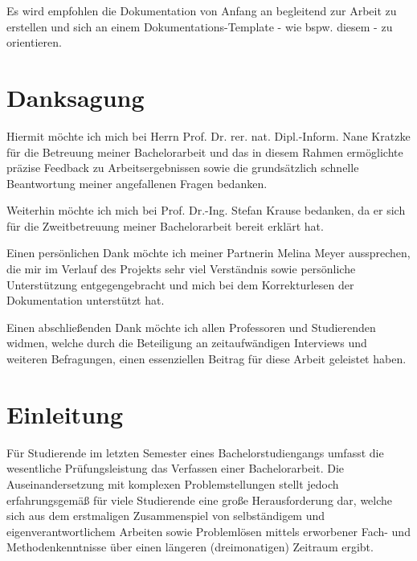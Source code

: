 \documentclass[bibliography=totoc,listof=totoc,BCOR=5mm,DIV=12,oneside]{scrbook}
\begin{document}
Es wird empfohlen die Dokumentation von Anfang an begleitend zur Arbeit zu erstellen und sich an einem Dokumentations-Template - wie bspw. diesem - zu orientieren.

\newpage


\newpage
\chapter*{Danksagung}
\par Hiermit möchte ich mich bei Herrn Prof. Dr. rer. nat. Dipl.-Inform. Nane Kratzke für die Betreuung meiner Bachelorarbeit und das in diesem Rahmen ermöglichte präzise Feedback zu Arbeitsergebnissen sowie die grundsätzlich schnelle Beantwortung meiner angefallenen Fragen bedanken.

\par \bigskip Weiterhin möchte ich mich bei Prof. Dr.-Ing. Stefan Krause bedanken, da er sich für die Zweitbetreuung meiner Bachelorarbeit bereit erklärt hat.

\par \bigskip Einen persönlichen Dank möchte ich meiner Partnerin Melina Meyer aussprechen, die mir im Verlauf des Projekts sehr viel Verständnis sowie persönliche Unterstützung entgegengebracht und mich bei dem Korrekturlesen der Dokumentation unterstützt hat.

\par \bigskip Einen abschließenden Dank möchte ich allen Professoren und Studierenden widmen, welche durch die Beteiligung an zeitaufwändigen Interviews und weiteren Befragungen, einen essenziellen Beitrag für diese Arbeit geleistet haben.

\tableofcontents
\newpage
\mainmatter
\pagestyle{plain}

\chapter{Einleitung}
\par Für Studierende im letzten Semester eines Bachelorstudiengangs umfasst die wesentliche Prüfungsleistung das Verfassen einer Bachelorarbeit.
Die Auseinandersetzung mit komplexen Problemstellungen stellt jedoch erfahrungsgemäß für viele Studierende eine große Herausforderung dar, welche sich aus dem erstmaligen Zusammenspiel von selbständigem und eigenverantwortlichem Arbeiten sowie Problemlösen mittels erworbener Fach- und Methodenkenntnisse über einen längeren (dreimonatigen) Zeitraum ergibt.
\end{document}
